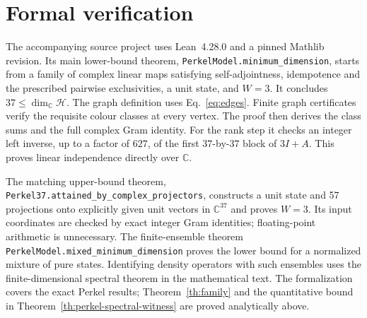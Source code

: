 \documentclass[11pt]{article}
\begin{document}
\section{Formal verification}
The accompanying source project uses Lean~4.28.0 and a pinned Mathlib revision. Its main lower-bound theorem, \texttt{PerkelModel.minimum\_dimension}, starts from a family of complex linear maps satisfying self-adjointness, idempotence and the prescribed pairwise exclusivities, a unit state, and $W=3$. It concludes $37\leq\dim_{\mathbb C}\mathcal H$. The graph definition uses Eq.~\eqref{eq:edges}. Finite graph certificates verify the requisite colour classes at every vertex. The proof then derives the class sums and the full complex Gram identity. For the rank step it checks an integer left inverse, up to a factor of $627$, of the first $37$-by-$37$ block of $3I+A$. This proves linear independence directly over $\mathbb C$.

The matching upper-bound theorem, \texttt{Perkel37.attained\_by\_complex\_projectors}, constructs a unit state and 57 projections onto explicitly given unit vectors in $\mathbb C^{37}$ and proves $W=3$. Its input coordinates are checked by exact integer Gram identities; floating-point arithmetic is unnecessary. The finite-ensemble theorem \texttt{PerkelModel.mixed\_minimum\_dimension} proves the lower bound for a normalized mixture of pure states. Identifying density operators with such ensembles uses the finite-dimensional spectral theorem in the mathematical text. The formalization covers the exact Perkel results; Theorem~\ref{th:family} and the quantitative bound in Theorem~\ref{th:perkel-spectral-witness} are proved analytically above.
\end{document}
